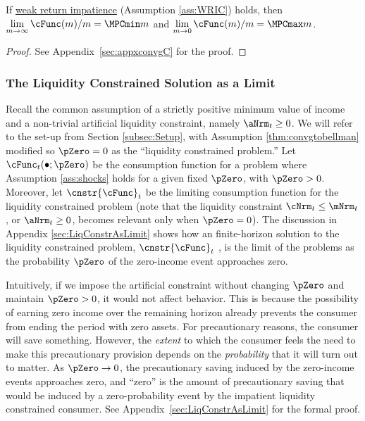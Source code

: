 \documentclass[BufferStockTheory]{subfiles}
\begin{document}
\begin{lemma}\label{lemma:MPCBoundsConvg}
If \hyperlink{WRIC}{weak return impatience} (Assumption \ref{ass:WRIC}) holds, then $\lim\limits_{m\rightarrow \infty} \cFunc (m)/m =\MPCmin m$ and $\lim\limits_{m\rightarrow 0} \cFunc (m)/m =\MPCmax m$. 
\end{lemma}
\begin{proof}\let\qed\relax
See Appendix~\ref{sec:appxconvgC} for the proof. 
\end{proof}


\hypertarget{The-Liquidity-Constrained-Solution-as-a-Limit}{}
\subsubsection{The Liquidity Constrained Solution as a Limit}\label{subsubsec:deatonIsLimit}

Recall the common assumption \citep{deatonLiqConstr,aiyagari:ge, lsIncFluct, mstIncFluct} of a strictly positive minimum value of income and a non-trivial artificial liquidity constraint, namely $\aNrm_{t}\geq 0$.
We will refer to the set-up from Section \ref{subsec:Setup}, with Assumption \ref{thm:convgtobellman} modified so $\pZero=0$ as the ``liquidity constrained problem.'' Let $\cFunc_{t}(\bullet;\pZero)$ be the consumption function for a problem where Assumption \ref{ass:shocks} holds for a given fixed $\pZero$, with $\pZero>0$.
Moreover, let $\cnstr{\cFunc}_{t}$ be the limiting consumption function for the liquidity constrained problem (note that the liquidity constraint $\cNrm_{t}\leq \mNrm_{t}$, or $\aNrm_{t}\geq 0$, becomes relevant only when $\pZero= 0$). The discussion in Appendix \ref{sec:LiqConstrAsLimit} shows how an finite-horizon solution to the liquidity constrained problem, $\cnstr{\cFunc}_{t}$ , is the limit of the problems as the probability $\pZero$ of the zero-income event approaches zero. 

Intuitively, if we impose the artificial constraint without changing $\pZero$ and maintain $\pZero>0$, it would not affect behavior.
This is because the possibility of earning zero income over the remaining horizon already prevents the consumer from ending the period with zero assets.
For precautionary reasons, the consumer will save something.
However, the \textit{extent} to which the consumer feels the need to make this precautionary provision depends on the \textit{probability} that it will turn out to matter.
As  $\pZero \rightarrow 0$, the   precautionary saving induced by the zero-income events approaches zero, and ``zero'' is the amount of precautionary saving that would be induced by a zero-probability event by the impatient liquidity constrained consumer.
See Appendix~\ref{sec:LiqConstrAsLimit} for the formal proof.
\end{document}
